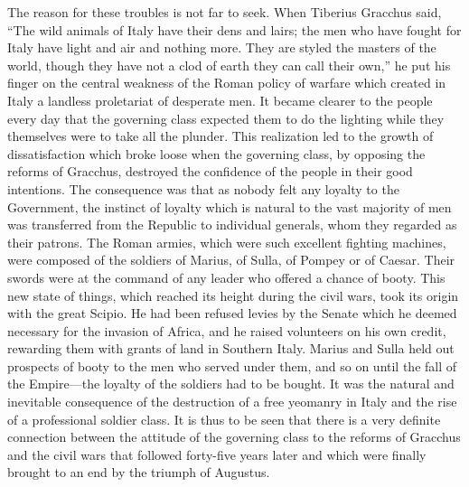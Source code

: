 \documentclass{book}
\begin{document}
The reason for these troubles is not far to seek. When Tiberius Gracchus said, “The wild animals of Italy have their dens and lairs; the men who have fought for Italy have light and air and nothing more. They are styled the masters of the world, though they have not a clod of earth they can call their own,” he put his finger on the central weakness of the Roman policy of warfare which created in Italy a landless proletariat of desperate men. It became clearer to the people every day that the governing class expected them to do the lighting while they themselves were to take all the plunder. This realization led to the growth of dissatisfaction which broke loose when the governing class, by opposing the reforms of Gracchus, destroyed the confidence of the people in their good intentions. The consequence was that as nobody felt any loyalty to the Government, the instinct of loyalty which is natural to the vast majority of men was transferred from the Republic to individual generals, whom they regarded as their patrons. The Roman armies, which were such excellent fighting machines, were composed of the soldiers of Marius, of Sulla, of Pompey or of Caesar. Their swords were at the command of any leader who offered a chance of booty. This new state of things, which reached its height during the civil wars, took its origin with the great Scipio. He had been refused levies by the Senate which he deemed necessary for the invasion of Africa, and he raised volunteers on his own credit, rewarding them with grants of land in Southern Italy. Marius and Sulla held out prospects of booty to the men who served under them, and so on until the fall of the Empire—the loyalty of the soldiers had to be bought. It was the natural and inevitable consequence of the destruction of a free yeomanry in Italy and the rise of a professional soldier class. It is thus to be seen that there is a very definite connection between the attitude of the governing class to the reforms of Gracchus and the civil wars that followed forty-five years later and which were finally brought to an end by the triumph of Augustus.
\end{document}
